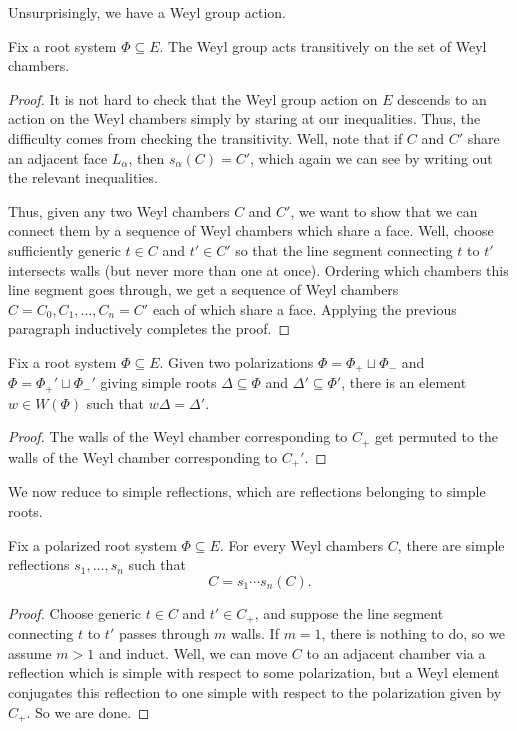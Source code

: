\documentclass[../notes.tex]{subfiles}
\begin{document}
Unsurprisingly, we have a Weyl group action.
\begin{proposition}
	Fix a root system $\Phi\subseteq E$. The Weyl group acts transitively on the set of Weyl chambers.
\end{proposition}
\begin{proof}
	It is not hard to check that the Weyl group action on $E$ descends to an action on the Weyl chambers simply by staring at our inequalities. Thus, the difficulty comes from checking the transitivity. Well, note that if $C$ and $C'$ share an adjacent face $L_\alpha$, then $s_\alpha(C)=C'$, which again we can see by writing out the relevant inequalities.

	Thus, given any two Weyl chambers $C$ and $C'$, we want to show that we can connect them by a sequence of Weyl chambers which share a face. Well, choose sufficiently generic $t\in C$ and $t'\in C'$ so that the line segment connecting $t$ to $t'$ intersects walls (but never more than one at once). Ordering which chambers this line segment goes through, we get a sequence of Weyl chambers $C=C_0,C_1,\ldots,C_n=C'$ each of which share a face. Applying the previous paragraph inductively completes the proof.
\end{proof}
\begin{corollary}
	Fix a root system $\Phi\subseteq E$. Given two polarizations $\Phi=\Phi_+\sqcup\Phi_-$ and $\Phi=\Phi_+'\sqcup\Phi_-'$ giving simple roots $\Delta\subseteq\Phi$ and $\Delta'\subseteq\Phi'$, there is an element $w\in W(\Phi)$ such that $w\Delta=\Delta'$.
\end{corollary}
\begin{proof}
	The walls of the Weyl chamber corresponding to $C_+$ get permuted to the walls of the Weyl chamber corresponding to $C_+'$.
\end{proof}
We now reduce to simple reflections, which are reflections belonging to simple roots.
\begin{lemma}
	Fix a polarized root system $\Phi\subseteq E$. For every Weyl chambers $C$, there are simple reflections $s_1,\ldots,s_n$ such that
	\[C=s_1\cdots s_n(C).\]
\end{lemma}
\begin{proof}
	Choose generic $t\in C$ and $t'\in C_+$, and suppose the line segment connecting $t$ to $t'$ passes through $m$ walls. If $m=1$, there is nothing to do, so we assume $m>1$ and induct. Well, we can move $C$ to an adjacent chamber via a reflection which is simple with respect to some polarization, but a Weyl element conjugates this reflection to one simple with respect to the polarization given by $C_+$. So we are done.
\end{proof}
\end{document}
